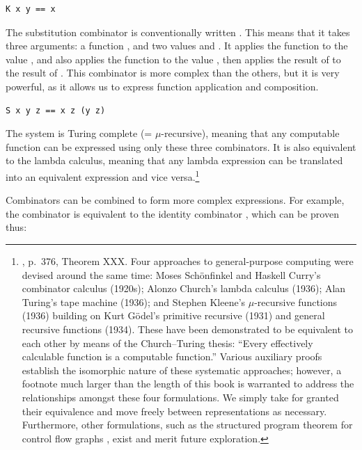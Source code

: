 \begin{lstlisting}[style=listingcomb,frame=tb]
K x y == x
\end{lstlisting}

The substitution combinator  is conventionally written .  This means that it takes three arguments: a function , and two values  and .  It applies the function  to the value , and also applies the function  to the value , then applies the result of  to the result of .  This combinator is more complex than the others, but it is very powerful, as it allows us to express function application and composition.

\begin{lstlisting}[style=listingcomb,frame=tb]
S x y z == x z (y z)
\end{lstlisting}

The  system is Turing complete (= $\mu$-recursive), meaning that any computable function can be expressed using only these three combinators.  It is also equivalent to the lambda calculus, meaning that any lambda expression can be translated into an equivalent  expression and vice versa.\footnote{\citet{Kleene1952}, p.~376, Theorem XXX.
Four approaches to general-purpose computing were devised around the same time:  Moses Schönfinkel and Haskell Curry's combinator  calculus (1920s); Alonzo Church's lambda calculus  (1936); Alan Turing's tape machine (1936); and Stephen Kleene's $\mu$-recursive functions (1936) building on Kurt G\"{o}del's primitive recursive (1931) and general recursive functions (1934).  These have been demonstrated to be equivalent to each other by means of the Church--Turing thesis:  ``Every effectively calculable function is a computable function.''  Various auxiliary proofs establish the isomorphic nature of these systematic approaches; however, a footnote much larger than the length of this book is warranted to address the relationships amongst these four formulations.  We simply take for granted their equivalence and move freely between representations as necessary.  Furthermore, other formulations, such as the structured program theorem for control flow graphs \citep{Bohm1966}, exist and merit future exploration.}

Combinators can be combined to form more complex expressions.  For example, the combinator  is equivalent to the identity combinator , which can be proven thus:

